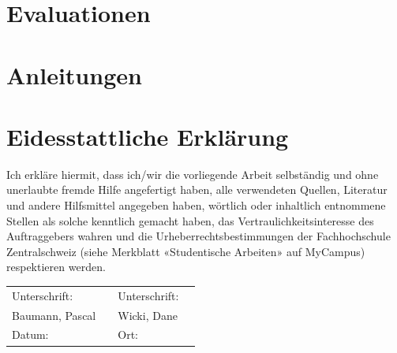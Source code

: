 \documentclass[a4paper]{scrreprt}
\begin{document}
\newpage

\chapter{Evaluationen}



\chapter{Anleitungen}



\chapter*{Eidesstattliche Erklärung}
Ich erkläre hiermit, dass ich/wir die vorliegende Arbeit selbständig und ohne unerlaubte fremde Hilfe angefertigt haben, alle verwendeten Quellen, Literatur und andere Hilfsmittel angegeben haben, wörtlich oder inhaltlich entnommene Stellen als solche kenntlich gemacht haben, das Vertraulichkeitsinteresse des Auftraggebers wahren und die Urheberrechtsbestimmungen der Fachhochschule Zentralschweiz (siehe Merkblatt «Studentische Arbeiten» auf MyCampus) respektieren werden.

\vspace{1em}

\renewcommand{\arraystretch}{2}
\begin{tabularx}{\textwidth}{XXXX}
	Unterschrift: & & Unterschrift: & \\ \cline{2-2}\cline{4-4}
	Baumann, Pascal & & Wicki, Dane & \\
	Datum: & & Ort: & \\
\end{tabularx}
\end{document}
